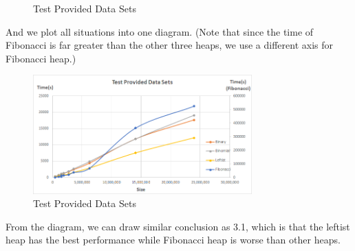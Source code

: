 \documentclass[twoside]{article}
\begin{document}
\begin{CJK*}{UTF8}{gbsn}
\begin{figure}[H]
\end{figure}
\begin{figure}[H]
    \centering
    \caption{Test Provided Data Sets}
\end{figure}
And we plot all situations into one diagram. (Note that since the time of Fibonacci is far greater than the other three heaps, we use a different axis for Fibonacci heap.)
\begin{figure}[H]
    \centering
    \includegraphics[width=0.75\textwidth]{ok.png}
    \caption{Test Provided Data Sets}
\end{figure}
From the diagram, we can draw similar conclusion as 3.1, which is that the leftist heap has the best performance while Fibonacci heap is worse than other heaps.

\end{CJK*}
\end{document}
